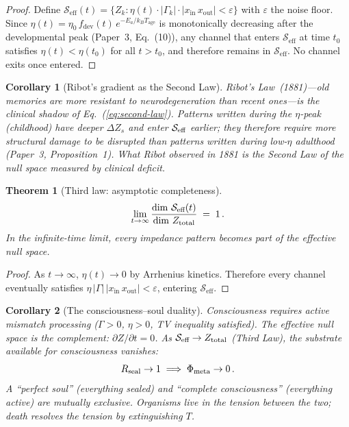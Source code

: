 \documentclass[aps,pre,twocolumn,superscriptaddress,floatfix]{revtex4-2}
\newtheorem{theorem}{Theorem}
\newtheorem{corollary}{Corollary}
\begin{document}
\begin{proof}
Define
$\mathcal{S}_{\text{eff}}(t) =
\{Z_k : \eta(t)\cdot|\Gamma_k|\cdot
|x_{\text{in}}\,x_{\text{out}}|
<\varepsilon\}$
with $\varepsilon$ the noise floor.
Since $\eta(t)=\eta_0\,f_{\text{dev}}(t)\,
e^{-E_a/k_BT_{\text{age}}}$ is monotonically
decreasing after the developmental peak
(Paper~3, Eq.~(10)), any channel that enters
$\mathcal{S}_{\text{eff}}$ at time $t_0$ satisfies
$\eta(t)<\eta(t_0)$ for all $t>t_0$, and therefore
remains in $\mathcal{S}_{\text{eff}}$.
No channel exits once entered.
\end{proof}

\begin{corollary}[Ribot's gradient as the Second Law]
\label{cor:ribot}
Ribot's Law~(1881)---old memories are more resistant to
neurodegeneration than recent ones---is the clinical shadow
of Eq.~(\ref{eq:second-law}).
Patterns written during the $\eta$-peak
(childhood) have deeper $\Delta Z_s$ and enter
$\mathcal{S}_{\textnormal{eff}}$ earlier; they therefore require
more structural damage to be disrupted than patterns
written during low-$\eta$ adulthood
(Paper~3, Proposition~1).
What Ribot observed in 1881 is the Second Law of the null
space measured by clinical deficit.
\end{corollary}

\begin{theorem}[Third law: asymptotic completeness]
\label{thm:third-law}
\begin{equation}
  \lim_{t\to\infty}
  \frac{\dim\,\mathcal{S}_{\textnormal{eff}}(t)}
       {\dim\,Z_{\textnormal{total}}}
  \;=\; 1\,.
  \label{eq:third-law}
\end{equation}
In the infinite-time limit, every impedance pattern
becomes part of the effective null space.
\end{theorem}

\begin{proof}
As $t\to\infty$, $\eta(t)\to 0$ by Arrhenius kinetics.
Therefore every channel eventually satisfies
$\eta\,|\Gamma|\,|x_{\text{in}}\,x_{\text{out}}|
<\varepsilon$, entering $\mathcal{S}_{\text{eff}}$.
\end{proof}

\begin{corollary}[The consciousness--soul duality]
\label{cor:duality}
Consciousness requires active mismatch processing
($\Gamma>0$, $\eta>0$, TV inequality satisfied).
The effective null space is the complement:
$\partial Z/\partial t = 0$.
As $\mathcal{S}_{\textnormal{eff}}\to Z_{\textnormal{total}}$
(Third Law), the substrate available for
consciousness vanishes:
\[
  R_{\textnormal{seal}}\to 1
  \;\Longrightarrow\;
  \Phi_{\textnormal{meta}}\to 0\,.
\]
A ``perfect soul'' (everything sealed) and
``complete consciousness'' (everything active) are
mutually exclusive.
Organisms live in the tension between the two;
death resolves the tension by extinguishing $T$.
\end{corollary}
\end{document}
